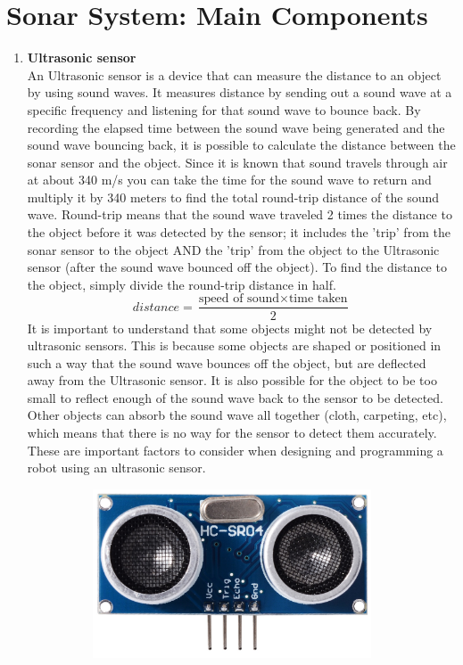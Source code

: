 \section{Sonar System: Main Components}
	\begin{enumerate}
		\item \textbf{Ultrasonic sensor}\\
		An Ultrasonic sensor is a device that can measure the distance to an object by using sound waves. 
		It measures distance by sending out a sound wave at a specific frequency and listening for that sound wave to bounce back. 
		By recording the elapsed time between the sound wave being generated and the sound wave bouncing back, it is possible to calculate the distance between the sonar sensor and the object.
		Since it is known that sound travels through air at about 340 m/s you can take the time for the sound wave to return and multiply it by 340 meters to find the total round-trip distance of the sound wave. 
		Round-trip means that the sound wave traveled 2 times the distance to the object before it was detected by the sensor; it includes the 'trip' from the sonar sensor to the object AND the 'trip' from the object to the Ultrasonic sensor (after the sound wave bounced off the object).
		To find the distance to the object, simply divide the round-trip distance in half.
		\begin{equation*}
        distance = \frac{\text{speed of sound} \times \text{time taken}}{2}
        \end{equation*}
		It is important to understand that some objects might not be detected by ultrasonic sensors. 
		This is because some objects are shaped or positioned in such a way that the sound wave bounces off the object, but are deflected away from the Ultrasonic sensor. 
		It is also possible for the object to be too small to reflect enough of the sound wave back to the sensor to be detected.
		Other objects can absorb the sound wave all together (cloth, carpeting, etc), which means that there is no way for the sensor to detect them accurately. 
		These are important factors to consider when designing and programming a robot using an ultrasonic sensor.
			\begin{figure}[H]
            \centering
            \includegraphics[width=10cm,height=5cm]{figures/ultra}

\end{figure}
\end{enumerate}
